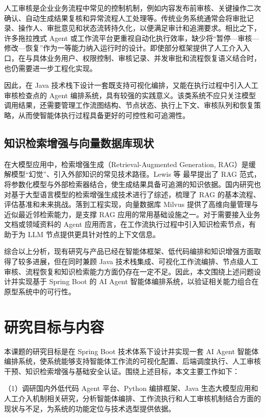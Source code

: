 人工审核是企业业务流程中常见的控制机制，例如内容发布前审核、关键操作二次确认、自动生成结果复核和异常流程人工处理等。传统业务系统通常会将审批记录、操作人、审批意见和状态流转持久化，以便满足审计和追溯要求。相比之下，许多拖拉拽式 Agent 或工作流平台更重视自动化执行效率，缺少将“暂停—审核—修改—恢复”作为一等能力纳入运行时的设计。即使部分框架提供了人工介入入口，在与具体业务用户、权限控制、审核记录、并发审批和流程恢复语义结合时，也仍需要进一步工程化实现。

因此，在 Java 技术栈下设计一套既支持可视化编排，又能在执行过程中引入人工审核检查点的 Agent 编排系统，具有较强的实践意义。该类系统不应只关注模型调用结果，还需要管理工作流图结构、节点状态、执行上下文、审核队列和恢复策略，从而使智能体执行过程具备更好的可控性和可追溯性。

\subsection{知识检索增强与向量数据库现状}

在大模型应用中，检索增强生成（Retrieval-Augmented Generation, RAG）是缓解模型“幻觉”、引入外部知识的常见技术路径。Lewis 等 最早提出了 RAG 范式，将参数化模型与外部检索器结合，使生成结果具备可追溯的知识依据。国内研究也对基于大型语言模型的检索增强生成技术进行了综述，梳理了 RAG 的基本流程、评估基准和未来挑战。落到工程实现，向量数据库 Milvus 提供了高维向量管理与近似最近邻检索能力，是支撑 RAG 应用的常用基础设施之一。对于需要接入业务文档或领域资料的 Agent 应用而言，在工作流执行过程中引入知识检索节点，有助于为 LLM 节点提供更具针对性的上下文信息。

综合以上分析，现有研究与产品已经在智能体框架、低代码编排和知识增强方面取得了较多进展，但在同时兼顾 Java 技术栈集成、可视化工作流编排、节点级人工审核、流程恢复和知识检索能力方面仍存在一定不足。因此，本文围绕上述问题设计并实现基于 Spring Boot 的 AI Agent 智能体编排系统，以验证相关能力组合在原型系统中的可行性。


\section{研究目标与内容}

本课题的研究目标是在 Spring Boot 技术体系下设计并实现一套 AI Agent 智能体编排系统，使系统能够支持智能体工作流的可视化配置、后端调度执行、人工审核干预、知识检索增强与基础安全认证。围绕上述目标，本文主要工作如下：

（1）调研国内外低代码 Agent 平台、Python 编排框架、Java 生态大模型应用和人工介入机制相关研究，分析智能体编排、工作流执行和人工审核机制结合方面的现状与不足，为系统的功能定位与技术选型提供依据。

